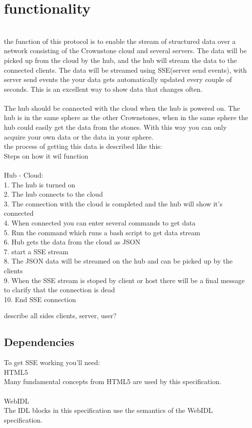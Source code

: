 \documentclass{article}
\begin{document}
\section{functionality} 
 \\
the function of this protocol is to enable the stream of structured data over a network consisting of the Crownstone cloud and several servers. The data will be picked up from the cloud by the hub, and the hub will stream the data to the connected clients. The data will be streamed using SSE(server send events), with server send events the your data gets automatically updated  every couple of seconds. This is an excellent way to show data that changes often.\\
\\
The hub should be connected with the cloud when the hub is powered on. The hub is in the same sphere as  the other Crownstones, when in the same sphere the hub could easily get the data from the stones. With this way you can only acquire your own data or the data in your sphere.  
\\
the process of getting this data is described like this:\\
Steps on how it wil function \\
\\
Hub  - Cloud: \\
1. The hub is turned on\\
2. The hub connects to the cloud\\
3. The connection with the cloud is completed and the hub will show it's connected\\
4. When connected you can enter several commands to get data\\
5. Run the command which runs a bash script to get data stream\\
6. Hub gets the data from the cloud as JSON\\
7. start a SSE stream \\
8. The JSON data will be streamed on the hub and can be picked up by the clients\\
9. When the SSE stream is stoped by client or host there will be a final message to clarify that the connection is dead\\
10. End SSE connection 


describe all sides clients, server, user? 
\subsection{Dependencies}\label{dependencies}
To get SSE working you'll need: \\
HTML5\\
Many fundamental concepts from HTML5 are used by this specification. \\
\\
WebIDL\\
The IDL blocks in this specification use the semantics of the WebIDL specification.
\end{document}
